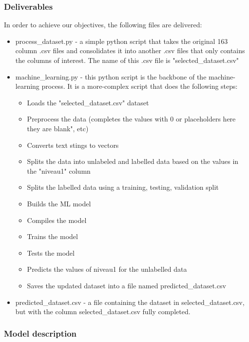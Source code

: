 \subsubsection{Deliverables}
In order to achieve our objectives, the following files are delivered: 
\begin{itemize}
    \item process\_dataset.py - a simple python script that takes the original 163 column .csv files and consolidates it into another .csv files that only contains the columns of interest. The name of this .csv file is "selected\_dataset.csv" 
    \item machine\_learning.py - this python script is the backbone of the machine-learning process. It is a more-complex script that does the following steps: 
        \begin{itemize}
            \item Loads the "selected\_dataset.csv" dataset
            \item Preprocess the data (completes the values with 0 or placeholders here they are blank", etc)
            \item Converts text stings to vectors
            \item Splits the data into unlabeled and labelled data based on the values in the "niveau1" column
            \item Splits the labelled data using a training, testing, validation split
            \item Builds the ML model
            \item Compiles the model
            \item Trains the model
            \item Tests the model
            \item Predicts the values of niveau1 for the unlabelled data
            \item Saves the updated dataset into a file named predicted\_dataset.csv
        \end{itemize}
    \item predicted\_dataset.csv - a file containing the dataset in selected\_dataset.csv, but with the column selected\_dataset.csv fully completed. 
\end{itemize}
\subsubsection{Model description}
